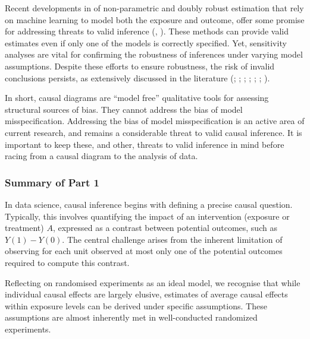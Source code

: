\documentclass[
  singlecolumn,
  9pt]{article}
\begin{document}
Recent developments in of non-parametric and doubly robust estimation
that rely on machine learning to model both the exposure and outcome,
offer some promise for addressing threats to valid inference
(,
). These methods can provide valid
estimates even if only one of the models is correctly specified. Yet,
sensitivity analyses are vital for confirming the robustness of
inferences under varying model assumptions. Despite these efforts to
ensure robustness, the risk of invalid conclusions persists, as
extensively discussed in the literature (; ; ;
;
;
;
).

In short, causal diagrams are ``model free'' qualitative tools for
assessing structural sources of bias. They cannot address the bias of
model misspecification. Addressing the bias of model misspecification is
an active area of current research, and remains a considerable threat to
valid causal inference. It is important to keep these, and other,
threats to valid inference in mind before racing from a causal diagram
to the analysis of data.

\subsubsection{Summary of Part 1}\label{summary-of-part-1}

In data science, causal inference begins with defining a precise causal
question. Typically, this involves quantifying the impact of an
intervention (exposure or treatment) \(A\), expressed as a contrast
between potential outcomes, such as \(Y(1) - Y(0)\). The central
challenge arises from the inherent limitation of observing for each unit
observed at most only one of the potential outcomes required to compute
this contrast.

Reflecting on randomised experiments as an ideal model, we recognise
that while individual causal effects are largely elusive, estimates of
average causal effects within exposure levels can be derived under
specific assumptions. These assumptions are almost inherently met in
well-conducted randomized experiments.
\end{document}
